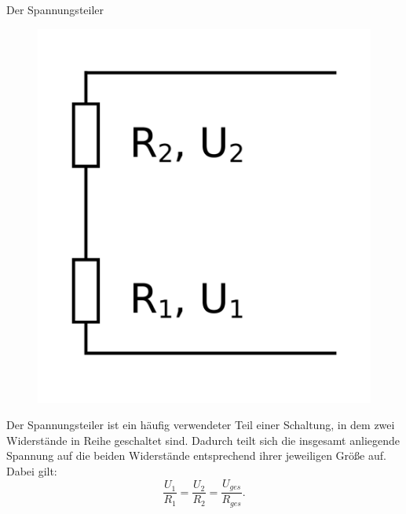 \begin{zsfg}{Der Spannungsteiler}
	
	\begin{figure}
		\centering
		\vspace{-0.5\baselineskip}
		\includegraphics[width=0.8\linewidth]{./Zeichnungen/spannungsteiler.png}
	\end{figure}
	Der Spannungsteiler ist ein häufig verwendeter Teil einer Schaltung, in dem zwei Widerstände in Reihe geschaltet sind. Dadurch teilt sich die insgesamt anliegende Spannung auf die beiden Widerstände entsprechend ihrer jeweiligen Größe auf. Dabei gilt:
	\begin{equation*}
		\frac{U_1}{R_1} = \frac{U_2}{R_2} = \frac{U_{ges}}{R_{ges}}.
	\end{equation*}
\end{zsfg}

